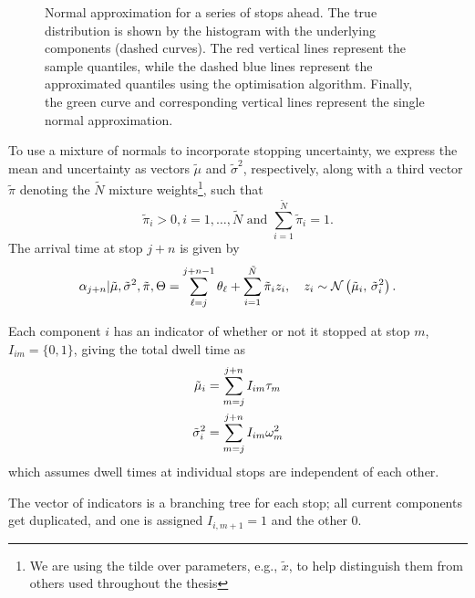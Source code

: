 \begin{knitrout}
\begin{figure}
{}

\caption[Normal approximation for a series of stops ahead]{Normal approximation for a series of stops ahead. The true distribution is shown by the histogram with the underlying components (dashed curves). The red vertical lines represent the sample quantiles, while the dashed blue lines represent the approximated quantiles using the optimisation algorithm. Finally, the green curve and corresponding vertical lines represent the single normal approximation.}\label{fig:normal_approx}
\end{figure}


\end{knitrout}


To use a mixture of normals to incorporate stopping uncertainty, we express the mean and uncertainty as vectors $\tilde\mu$ and $\tilde\sigma^2$, respectively, along with a third vector $\tilde\pi$ denoting the $\tilde N$ mixture weights\footnote{We are using the tilde over parameters, e.g., $\tilde x$, to help distinguish them from others used throughout the thesis}, such that
\begin{equation}
\label{eq:ch5:mixture_weight_spec}
\tilde\pi_i > 0, i = 1, \ldots, \tilde N
\text{ and } \sum_{i=1}^{\tilde N} \tilde\pi_i = 1.
\end{equation}
The arrival time at stop $j + n$ is given by
\begin{equation}
\label{eq:arrival_time_normal_approx}
\alpha_{j+n} | \tilde\mu, \tilde\sigma^2, \tilde\pi, \Theta =
\sum_{\ell=j}^{j+n-1} \theta_\ell +
\sum_{i=1}^{\tilde N} \tilde\pi_i z_i,\quad
z_i \sim \mathcal{N}\left(\tilde\mu_i,\, \tilde\sigma^2_i\right).
\end{equation}


Each component $i$ has an indicator of whether or not it stopped at stop $m$, $I_{im} = \{0,1\}$, giving the total dwell time as
\begin{equation}
\label{eq:mixture_dwell_times}
\begin{split}
\tilde\mu_i &= \sum_{m=j}^{j+n} I_{im} \tau_m \\
\tilde\sigma_i^2 &= \sum_{m=j}^{j+n} I_{im} \omega^2_m
\end{split}
\end{equation}
which assumes dwell times at individual stops are independent of each other.

The vector of indicators is a branching tree for each stop; all current components get duplicated, and one is assigned $I_{i,m+1} = 1$ and the other 0.


